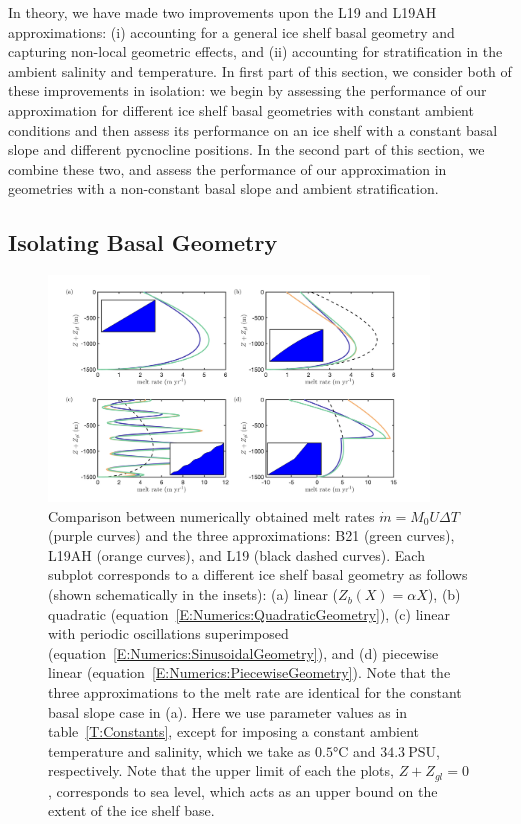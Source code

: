 \documentclass[openacc]{rsproca_new}%
\begin{document}
In theory, we have made two improvements upon the L19 and L19AH approximations: (i) accounting for a general ice shelf basal geometry and capturing non-local geometric effects, and (ii) accounting for stratification in the ambient salinity and temperature. In first part of this section, we consider both of these improvements in isolation: we begin by assessing the performance of our approximation for different ice shelf basal geometries with constant ambient conditions and then assess its performance on an ice shelf with a constant basal slope and different pycnocline positions. In the second part of this section, we combine these two, and assess the performance of our approximation in geometries with a non-constant basal slope and ambient stratification.

\subsection{Isolating Basal Geometry}\label{S:Numerics:NoPycnocline}
\begin{figure}
\centering
\includegraphics[width = 0.9\textwidth]{Submitted_PRSA/make_plots/plots/figure6.png}
\caption{Comparison between numerically obtained melt rates $\dot{m}= M_0 U \Delta T$ (purple curves) and the three approximations: B21 (green curves), L19AH (orange curves), and L19 (black dashed curves). Each subplot corresponds to a different ice shelf basal geometry as follows (shown schematically in the insets): (a) linear ($Z_b(X) = \alpha X$), (b) quadratic (equation~\eqref{E:Numerics:QuadraticGeometry}), (c) linear with periodic oscillations superimposed (equation~\eqref{E:Numerics:SinusoidalGeometry}), and (d) piecewise linear (equation~\eqref{E:Numerics:PiecewiseGeometry}). Note that the three approximations to the melt rate are identical for the constant basal slope case in (a).  Here we use parameter values as in table~\ref{T:Constants}, except for imposing a constant ambient temperature and salinity, which we take as $ 0.5\si{\celsius}$ and $34.3~\text{PSU}$, respectively. Note that the upper limit of each the plots, $Z + Z_{gl} = 0$, corresponds to sea level, which acts as an upper bound on the extent of the ice shelf base.}   \label{fig:Numerics:Geometry}
\end{figure}
\end{document}
